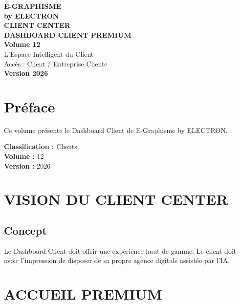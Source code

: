\documentclass[12pt,a4paper,oneside]{book}
\begin{document}
\begin{titlepage}
\thispagestyle{empty}
\begin{center}
\vspace*{2cm}
{\Huge\bfseries\color{bleuIA}E-GRAPHISME}\\[0.3cm]
{\LARGE\bfseries\color{violet}by ELECTRON}\\[2cm]
\vspace{2cm}
{\huge\bfseries\color{noir}CLIENT CENTER}\\[0.3cm]
{\huge\bfseries\color{noir}DASHBOARD CLIENT PREMIUM}\\[1cm]
{\Large\bfseries\color{cyan}Volume 12}\\[3cm]
\vspace{2cm}
{\Large\color{gris}L'Espace Intelligent du Client}\\[0.5cm]
{\Large\color{gris}Accès : Client / Entreprise Cliente}\\[3cm]
{\Large\bfseries\color{or}Version 2026}\\[2cm]
\vfill
\end{center}
\end{titlepage}

\frontmatter

\chapter*{Préface}
Ce volume présente le Dashboard Client de E-Graphisme by ELECTRON.

\bigskip
\textbf{Classification :} Clients\\
\textbf{Volume :} 12\\
\textbf{Version :} 2026

\tableofcontents

\mainmatter

\chapter{VISION DU CLIENT CENTER}

\section{Concept}
Le Dashboard Client doit offrir une expérience haut de gamme. Le client doit avoir l'impression de disposer de sa propre agence digitale assistée par l'IA.

\chapter{ACCUEIL PREMIUM}
\end{document}
